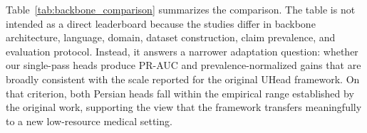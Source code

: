 \documentclass[conference]{IEEEtran}
\begin{document}
Table~\ref{tab:backbone_comparison} summarizes the comparison. The table is not intended as a direct leaderboard because the studies differ in backbone architecture, language, domain, dataset construction, claim prevalence, and evaluation protocol. Instead, it answers a narrower adaptation question: whether our single-pass heads produce PR-AUC and prevalence-normalized gains that are broadly consistent with the scale reported for the original UHead framework. On that criterion, both Persian heads fall within the empirical range established by the original work, supporting the view that the framework transfers meaningfully to a new low-resource medical setting.

\begin{table}[ht]

\centering

\scriptsize

\caption{Comparison with representative PR-AUC results from the original UHead study~\cite{b1}. Random-normalized values are computed as PR-AUC divided by the corresponding random baseline. Ranges summarize the heterogeneous sets reported in that study.}

\label{tab:backbone_comparison}


\end{table}
\end{document}
